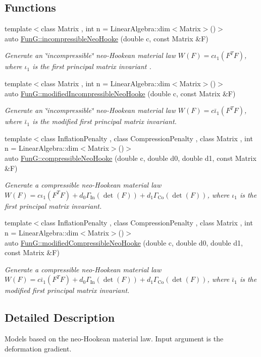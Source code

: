 \subsection*{\-Functions}
\begin{DoxyCompactItemize}
\item 
{\footnotesize template$<$class Matrix , int n = \-Linear\-Algebra\-::dim$<$\-Matrix$>$()$>$ }\\auto \hyperlink{group__Rubber_ga5bb28aef7006413775791998936d6b81}{\-Fun\-G\-::incompressible\-Neo\-Hooke} (double c, const \-Matrix \&\-F)
\begin{DoxyCompactList}\small\item\em \-Generate an \char`\"{}incompressible\char`\"{} neo-\/\-Hookean material law $ W(F)=c\iota_1(F^T F) $, where $\iota_1$ is the first principal matrix invariant . \end{DoxyCompactList}\item 
{\footnotesize template$<$class Matrix , int n = \-Linear\-Algebra\-::dim$<$\-Matrix$>$()$>$ }\\auto \hyperlink{group__Rubber_gaf6f5ab6a379ef03d513acc5042731a01}{\-Fun\-G\-::modified\-Incompressible\-Neo\-Hooke} (double c, const \-Matrix \&\-F)
\begin{DoxyCompactList}\small\item\em \-Generate an \char`\"{}incompressible\char`\"{} neo-\/\-Hookean material law $ W(F)=c\bar\iota_1(F^T F) $, where $\bar\iota_1$ is the modified first principal matrix invariant. \end{DoxyCompactList}\item 
{\footnotesize template$<$class Inflation\-Penalty , class Compression\-Penalty , class Matrix , int n = \-Linear\-Algebra\-::dim$<$\-Matrix$>$()$>$ }\\auto \hyperlink{group__Rubber_gac5c39cd9de55f4f0220a806cf28a7b30}{\-Fun\-G\-::compressible\-Neo\-Hooke} (double c, double d0, double d1, const \-Matrix \&\-F)
\begin{DoxyCompactList}\small\item\em \-Generate a compressible neo-\/\-Hookean material law $ W(F)=c\iota_1(F^T F)+d_0\Gamma_\mathrm{In}(\det(F))+d_1\Gamma_\mathrm{Co}(\det(F)) $, where $\iota_1$ is the first principal matrix invariant. \end{DoxyCompactList}\item 
{\footnotesize template$<$class Inflation\-Penalty , class Compression\-Penalty , class Matrix , int n = \-Linear\-Algebra\-::dim$<$\-Matrix$>$()$>$ }\\auto \hyperlink{group__Rubber_gac10942df03f037afdf0a81d330361a6b}{\-Fun\-G\-::modified\-Compressible\-Neo\-Hooke} (double c, double d0, double d1, const \-Matrix \&\-F)
\begin{DoxyCompactList}\small\item\em \-Generate a compressible neo-\/\-Hookean material law $ W(F)=c\bar\iota_1(F^T F)+d_0\Gamma_\mathrm{In}(\det(F))+d_1\Gamma_\mathrm{Co}(\det(F)) $, where $\bar\iota_1$ is the modified first principal matrix invariant. \end{DoxyCompactList}\end{DoxyCompactItemize}


\subsection{\-Detailed \-Description}
\-Models based on the neo-\/\-Hookean material law. \-Input argument is the deformation gradient. 